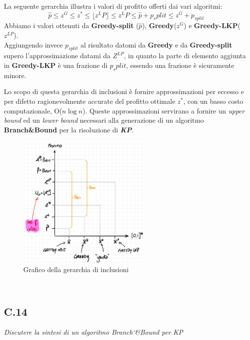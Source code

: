 \documentclass[a4paper]{article}
\newcommand{\imp}[1]{\textbf{\textit{#1}}}
\begin{document}
La seguente gerarchia illustra i valori di profitto offerti dai vari algoritmi:
$$\hat p \leq z^G \leq z^* \leq \lfloor z^LP \rfloor  \leq z^LP \leq \hat p + p_split \leq z^G + p_{split}$$
Abbiamo i valori ottenuti da \textbf{Greedy-split} ($\hat p$), \textbf{Greedy}($z^G$) e \textbf{Greedy-LKP}($z^{LP}$).\\
Aggiungendo invece $p_{split}$ al risultato datomi da \textbf{Greedy} e da \textbf{Greedy-split} supero l'approssimazione datami da $Z^{LP}$, in quanto la parte di elemento aggiunta in \textbf{Greedy-LKP} è una frazione di $p_split$, essendo una frazione è sicuramente minore.

Lo scopo di questa gerarchia di inclusioni è fornire approssimazioni per eccesso e per difetto ragionevolmente accurate del profitto ottimale $z^*$, con un basso costo computazionale, O($n\log n$).
Queste approssimazioni servirano a fornire un \textit{upper bound} ed un \textit{lower bound} necessari alla generazione di un algoritmo \textbf{Branch\&Bound} per la risoluzione di \imp{KP}.\\
\begin{figure}[!ht]
\centering
\includegraphics[width=0.6\textwidth]{./img/C_13.png}
\caption{Grafico della gerarchia di inclusioni} \label{FIG:C_13}
\end{figure}\\
\subsection{C.14}
\emph{Discutere la sintesi di un algoritmo Branch\char`&Bound per KP}
\end{document}
